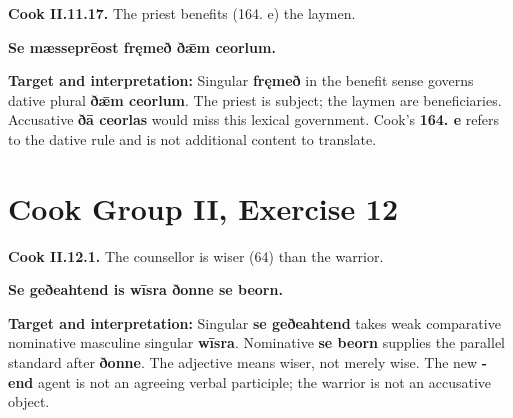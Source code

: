 \par\begin{minipage}{\linewidth}\raggedright
\textbf{Cook II.11.17.} The priest benefits (164. e) the laymen.

\textbf{Se mæsseprēost fręmeð ðǣm ceorlum.}

\textbf{Target and interpretation:} Singular \textbf{fręmeð} in the benefit sense governs dative plural \textbf{ðǣm ceorlum}. The priest is subject; the laymen are beneficiaries. Accusative \textbf{ðā ceorlas} would miss this lexical government. Cook's \textbf{164. e} refers to the dative rule and is not additional content to translate.

\end{minipage}\par\addvspace{4pt}

\section*{Cook Group II, Exercise 12}

\par\begin{minipage}{\linewidth}\raggedright
\textbf{Cook II.12.1.} The counsellor is wiser (64) than the warrior.

\textbf{Se geðeahtend is wīsra ðonne se beorn.}

\textbf{Target and interpretation:} Singular \textbf{se geðeahtend} takes weak comparative nominative masculine singular \textbf{wīsra}. Nominative \textbf{se beorn} supplies the parallel standard after \textbf{ðonne}. The adjective means wiser, not merely wise. The new \textbf{-end} agent is not an agreeing verbal participle; the warrior is not an accusative object.

\end{minipage}\par\addvspace{4pt}

